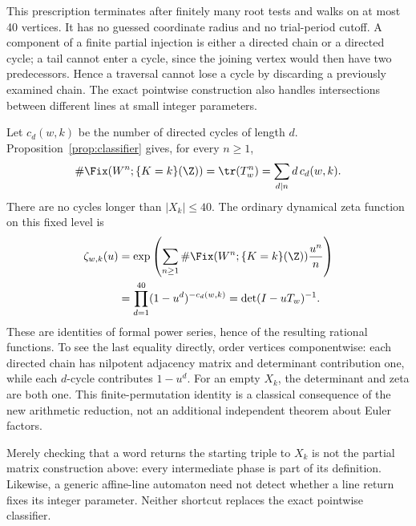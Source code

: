 This prescription terminates after finitely many root tests
and walks on at most 40 vertices. It has no guessed coordinate
radius and no trial-period cutoff. A component of a finite
partial injection is either a directed chain or a directed
cycle; a tail cannot enter a cycle, since the joining vertex
would then have two predecessors. Hence a traversal cannot
lose a cycle by discarding a previously examined chain.
The exact pointwise construction also handles intersections
between different lines at small integer parameters.

Let $c_d(w,k)$ be the number of directed cycles of length $d$.
Proposition~\ref{prop:classifier} gives, for every $n\ge1$,
\begin{equation}\label{eq:counts}
 \#\Fix(W^n;\{K=k\}(\Z))
   =\tr(T_w^n)=\sum_{d\mid n}d\,c_d(w,k).
\end{equation}
There are no cycles longer than $|X_k|\le40$.
The ordinary dynamical zeta function on this fixed level is
\begin{equation}\label{eq:zeta}
 \begin{aligned}
 \zeta_{w,k}(u)
  &=\exp\left(\sum_{n\ge1}
       \#\Fix(W^n;\{K=k\}(\Z))\frac{u^n}{n}\right)\\
  &=\prod_{d=1}^{40}(1-u^d)^{-c_d(w,k)}
    =\det(I-uT_w)^{-1}.
 \end{aligned}
\end{equation}
These are identities of formal power series, hence of the
resulting rational functions. To see the last equality
directly, order vertices componentwise: each directed chain
has nilpotent adjacency matrix and determinant contribution
one, while each $d$-cycle contributes $1-u^d$.
For an empty $X_k$, the determinant and zeta are both one.
This finite-permutation identity is a classical consequence
of the new arithmetic reduction, not an additional
independent theorem about Euler factors.

\begin{remark}
Merely checking that a word returns the starting triple to
$X_k$ is not the partial matrix construction above: every
intermediate phase is part of its definition. Likewise,
a generic affine-line automaton need not detect whether a
line return fixes its integer parameter. Neither shortcut
replaces the exact pointwise classifier.
\end{remark}
